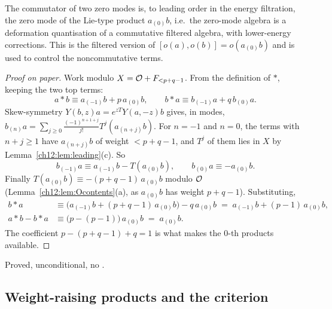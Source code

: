 \begin{physics}
The commutator of two zero modes is, to leading order in the energy filtration, the zero mode of the Lie-type product $a_{(0)}b$, i.e.\ the zero-mode algebra is a deformation quantisation of a commutative filtered algebra, with lower-energy corrections. This is the filtered version of $[o(a),o(b)]=o(a_{(0)}b)$ and is used to control the noncommutative terms.
\end{physics}
\begin{proof}[Proof on paper]
Work modulo $X=\mathcal{O}+F_{<p+q-1}$.  From the definition of $\ast$, keeping the two top terms:
\begin{equation*}
 a\ast b\equiv a_{(-1)}b + p\,a_{(0)}b,\qquad b\ast a\equiv b_{(-1)}a+q\,b_{(0)}a .
\end{equation*}
Skew-symmetry $Y(b,z)a=e^{zT}Y(a,-z)b$ gives, in modes,
$b_{(n)}a=\sum_{j\ge0}\frac{(-1)^{n+1+j}}{j!}T^j(a_{(n+j)}b)$.  For $n=-1$ and $n=0$, the terms with
$n+j\ge1$ have $a_{(n+j)}b$ of weight $<p+q-1$, and $T^j$ of them lies in $X$ by
Lemma~\ref{ch12:lem:leading}(c).  So
\begin{equation*}
 b_{(-1)}a\equiv a_{(-1)}b - T(a_{(0)}b),\qquad b_{(0)}a\equiv -a_{(0)}b .
\end{equation*}
Finally $T(a_{(0)}b)\equiv-(p+q-1)\,a_{(0)}b$ modulo $\mathcal{O}$
(Lemma~\ref{ch12:lem:Ocontents}(a), as $a_{(0)}b$ has weight $p+q-1$).  Substituting,
\begin{align*}
 b\ast a &\equiv \big(a_{(-1)}b+(p+q-1)\,a_{(0)}b\big) - q\,a_{(0)}b \;=\; a_{(-1)}b+(p-1)\,a_{(0)}b,\\
 a\ast b-b\ast a &\equiv \big(p-(p-1)\big)\,a_{(0)}b \;=\; a_{(0)}b .
\end{align*}
The coefficient $p-(p+q-1)+q=1$ is what makes the $0$-th products available.
\end{proof}
\begin{status}Proved, unconditional, no .\end{status}

\subsection{Weight-raising products and the criterion}

